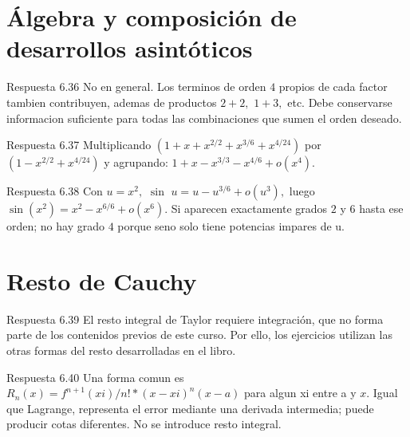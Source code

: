 \documentclass[10pt,a4paper,oneside,openany]{book}
\begin{document}
\section{Álgebra y composición de desarrollos asintóticos}
\begin{PSevenAnswerFixed}{Respuesta 6.36}
No en general. Los terminos de orden \(4\) propios de cada factor tambien contribuyen, ademas de productos \(2+2,\) \(1+3,\) etc. Debe conservarse informacion suficiente para todas las combinaciones que sumen el orden deseado.
\end{PSevenAnswerFixed}
\begin{PSevenAnswerFixed}{Respuesta 6.37}
Multiplicando \((1+x+x^{2/2}+x^{3/6}+x^{4/24})\) por \((1-x^{2/2}+x^{4/24})\) y agrupando: \(1+x-x^{3/3}-x^{4/6}+o(x^{4})\).
\end{PSevenAnswerFixed}
\begin{PSevenAnswerFixed}{Respuesta 6.38}
Con \(u=x^{2},\) \(\sin\) \(u=u-u^{3/6}+o(u^{3}),\) luego \(\sin(x^{2})=x^{2}-x^{6/6}+o(x^{6})\). Si aparecen exactamente grados \(2\) y \(6\) hasta ese orden; no hay grado \(4\) porque seno solo tiene potencias impares de u.
\end{PSevenAnswerFixed}
\section{Resto de Cauchy}
\begin{PSevenAnswerFixed}{Respuesta 6.39}
El resto integral de Taylor requiere integración, que no forma parte de los contenidos previos de este curso. Por ello, los ejercicios utilizan las otras formas del resto desarrolladas en el libro.
\end{PSevenAnswerFixed}
\begin{PSevenAnswerFixed}{Respuesta 6.40}
Una forma comun es \(R_n(x)=f^{n+1}(xi)/n!*(x-xi)^n(x-a)\) para algun xi entre a y \(x\). Igual que Lagrange, representa el error mediante una derivada intermedia; puede producir cotas diferentes. No se introduce resto integral.
\end{PSevenAnswerFixed}
\end{document}
